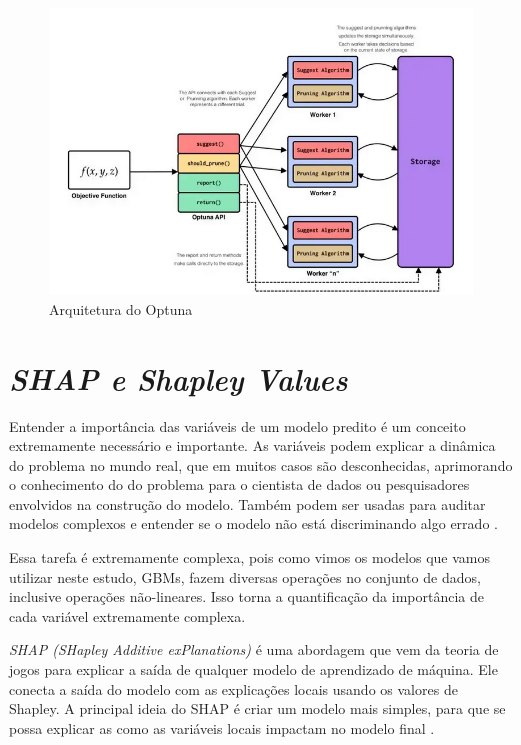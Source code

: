 \begin{figure}[H]
 \caption{Arquitetura do Optuna}
 \label{fig:arq:optuna}
 \centering
 \includegraphics[scale=0.3]{images/arquitetura_optuna.png}
\end{figure}

\section{\textit{SHAP e Shapley Values}}
Entender a importância das variáveis de um modelo predito é um conceito extremamente necessário e importante. As variáveis podem explicar a dinâmica do problema no mundo real, que em muitos casos são desconhecidas, aprimorando o conhecimento do 
 do problema para o cientista de dados ou pesquisadores envolvidos na construção do modelo. Também podem ser usadas para auditar modelos complexos e entender se o modelo não está discriminando algo errado \cite{article:tec:interpr}.

 Essa tarefa é extremamente complexa, pois como vimos os modelos que vamos utilizar neste estudo, GBMs, fazem diversas operações no conjunto de dados, inclusive operações não-lineares. Isso torna a quantificação da importância de cada variável extremamente complexa.

\textit{SHAP (SHapley Additive exPlanations)} é uma abordagem que vem da teoria de jogos para explicar a saída de qualquer modelo de aprendizado de máquina. Ele conecta a saída do modelo com as explicações locais usando os valores de Shapley. A principal ideia do SHAP é criar um modelo mais simples, para que se possa explicar as como as variáveis locais impactam no modelo final \cite{shap:article,shap:article2,shap:doc}.

